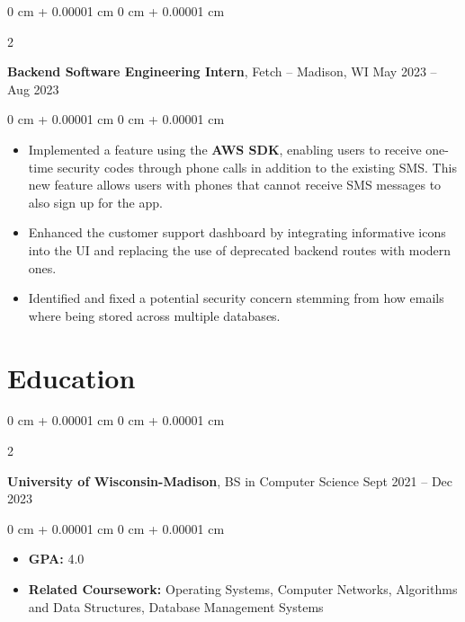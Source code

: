 \documentclass[10pt, letterpaper]{article}
\newenvironment{highlights}{
    \begin{itemize}[
        topsep=0.10 cm,
        parsep=0.10 cm,
        partopsep=0pt,
        itemsep=0pt,
        leftmargin=0 cm + 10pt
    ]
}{
    \end{itemize}
} %
\newenvironment{onecolentry}{
    \begin{adjustwidth}{
        0 cm + 0.00001 cm
    }{
        0 cm + 0.00001 cm
    }
}{
    \end{adjustwidth}
} %
\newenvironment{twocolentry}[2][]{
    \onecolentry
    \def\secondColumn{#2}
    \setcolumnwidth{\fill, 4.5 cm}
    \begin{paracol}{2}
}{
    \switchcolumn \raggedleft \secondColumn
    \end{paracol}
    \endonecolentry
} %
\begin{document}
        \vspace{0.2 cm}

        \begin{twocolentry}{
            May 2023 – Aug 2023
        }
            \textbf{Backend Software Engineering Intern}, Fetch -- Madison, WI\end{twocolentry}

        \vspace{0.10 cm}
        \begin{onecolentry}
            \begin{highlights}
                \item Implemented a feature using the \textbf{AWS SDK}, enabling users to receive one-time security codes through phone calls in addition to the existing SMS. This new feature allows users with phones that cannot receive SMS messages to also sign up for the app.
                \item Enhanced the customer support dashboard by integrating informative icons into the UI and replacing the use of deprecated backend routes with modern ones.
                \item Identified and fixed a potential security concern stemming from how emails where being stored across multiple databases.
            \end{highlights}
        \end{onecolentry}


    \section{Education}
    
        \begin{twocolentry}{
            Sept 2021 – Dec 2023
        }
            \textbf{University of Wisconsin-Madison}, BS in Computer Science\end{twocolentry}

        \vspace{0.10 cm}
        \begin{onecolentry}
            \begin{highlights}
                \item \textbf{GPA:} 4.0
                \item \textbf{Related Coursework:} Operating Systems, Computer Networks, Algorithms and Data Structures, Database Management Systems
            \end{highlights}
        \end{onecolentry}
\end{document}
